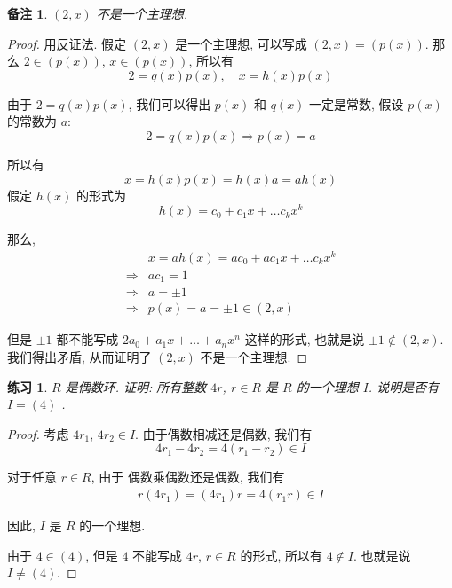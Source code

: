 \documentclass[utf8]{ctexbook}
\newtheorem{memo}{备注}[section]
\newtheorem{exercise}{练习}[section]
\begin{document}
\begin{memo}\label{memo_2_x_not_max_ideal}
$(2, x)$ 不是一个主理想. 
\end{memo}

\begin{proof}
用反证法. 假定 $(2, x)$ 是一个主理想, 可以写成 $(2, x) = (p(x))$. 那么 $2 \in (p(x))$, $x \in (p(x))$, 所以有
\begin{equation}
2 = q(x) p(x), \quad x = h(x) p(x) \nonumber
\end{equation} 

由于 $2 = q(x) p(x)$, 我们可以得出 $p(x)$ 和 $q(x)$ 一定是常数, 假设 $p(x)$ 的常数为 $a$:
\begin{equation}
2 = q(x) p(x) \Longrightarrow p(x) = a   \nonumber
\end{equation} 

所以有
\begin{equation}
x = h(x) p(x) = h(x) a = a h(x) \nonumber
\end{equation}
假定 $h(x)$ 的形式为
\begin{equation}
h(x) = c_0 + c_1 x + \ldots c_k x^k \nonumber
\end{equation}

那么,
\begin{align*}
& x = a h(x) = a c_0 + a c_1 x + \ldots c_k x^k  \\
\Longrightarrow & a c_1 = 1 \\
\Longrightarrow & a = \pm 1 \\
\Longrightarrow & p(x) = a = \pm 1 \in (2, x)
\end{align*}

但是 $\pm 1$ 都不能写成 $2 a_0 + a_1 x + \ldots + a_n x^n$ 这样的形式, 也就是说 $\pm 1 \not \in (2, x)$. 我们得出矛盾, 从而证明了 $(2, x)$ 不是一个主理想.
\end{proof}

\begin{exercise}
$R$ 是偶数环. 证明: 所有整数 $4r$, $r \in R$ 是 $R$ 的一个理想 $I$. 说明是否有 $I = (4)$ .
\end{exercise}

\begin{proof}
考虑 $4 r_1$, $4 r_2 \in I$. 由于偶数相减还是偶数, 我们有
\begin{equation}
4 r_1 - 4 r_2 = 4(r_1 - r_2) \in I \nonumber
\end{equation}

对于任意 $r \in R$, 由于 偶数乘偶数还是偶数, 我们有
\begin{align*}
r( 4 r_1) = (4 r_1) r = 4 (r_1 r) \in I
\end{align*}

因此, $I$ 是 $R$ 的一个理想.

由于 $4 \in (4)$, 但是 $4$ 不能写成 $4r$, $r \in R$ 的形式, 所以有 $4 \not \in I$. 也就是说 $I \neq (4)$.

\end{proof}
\end{document}
